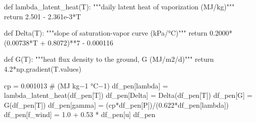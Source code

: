 \documentclass[
  letterpaper,
  DIV=11,
  numbers=noendperiod]{scrreprt}
\newenvironment{Shaded}{\begin{snugshade}}{\end{snugshade}}
\newcommand{\CommentTok}[1]{\textcolor[rgb]{0.37,0.37,0.37}{#1}}
\newcommand{\ControlFlowTok}[1]{\textcolor[rgb]{0.00,0.23,0.31}{#1}}
\newcommand{\DecValTok}[1]{\textcolor[rgb]{0.68,0.00,0.00}{#1}}
\newcommand{\FloatTok}[1]{\textcolor[rgb]{0.68,0.00,0.00}{#1}}
\newcommand{\KeywordTok}[1]{\textcolor[rgb]{0.00,0.23,0.31}{#1}}
\newcommand{\NormalTok}[1]{\textcolor[rgb]{0.00,0.23,0.31}{#1}}
\newcommand{\OperatorTok}[1]{\textcolor[rgb]{0.37,0.37,0.37}{#1}}
\newcommand{\StringTok}[1]{\textcolor[rgb]{0.13,0.47,0.30}{#1}}
\begin{document}
\begin{Shaded}
\begin{Highlighting}[]
\KeywordTok{def}\NormalTok{ lambda\_latent\_heat(T):}
    \CommentTok{"""daily latent heat of vaporization (MJ/kg)"""}
    \ControlFlowTok{return} \FloatTok{2.501} \OperatorTok{{-}} \FloatTok{2.361e{-}3}\OperatorTok{*}\NormalTok{T}

\KeywordTok{def}\NormalTok{ Delta(T):}
    \CommentTok{"""slope of saturation{-}vapor curve (kPa/°C)"""}
    \ControlFlowTok{return} \FloatTok{0.2000}\OperatorTok{*}\NormalTok{(}\FloatTok{0.00738}\OperatorTok{*}\NormalTok{T }\OperatorTok{+} \FloatTok{0.8072}\NormalTok{)}\OperatorTok{**}\DecValTok{7} \OperatorTok{{-}} \FloatTok{0.000116}

\KeywordTok{def}\NormalTok{ G(T):}
    \CommentTok{"""heat flux density to the ground, G (MJ/m2/d)"""}
    \ControlFlowTok{return} \FloatTok{4.2}\OperatorTok{*}\NormalTok{np.gradient(T.values)}

\NormalTok{cp }\OperatorTok{=} \FloatTok{0.001013}  \CommentTok{\# (MJ kg−1 °C−1) }
\NormalTok{df\_pen[}\StringTok{\textquotesingle{}lambda\textquotesingle{}}\NormalTok{] }\OperatorTok{=}\NormalTok{ lambda\_latent\_heat(df\_pen[}\StringTok{\textquotesingle{}T\textquotesingle{}}\NormalTok{])}
\NormalTok{df\_pen[}\StringTok{\textquotesingle{}Delta\textquotesingle{}}\NormalTok{] }\OperatorTok{=}\NormalTok{ Delta(df\_pen[}\StringTok{\textquotesingle{}T\textquotesingle{}}\NormalTok{])}
\NormalTok{df\_pen[}\StringTok{\textquotesingle{}G\textquotesingle{}}\NormalTok{] }\OperatorTok{=}\NormalTok{ G(df\_pen[}\StringTok{\textquotesingle{}T\textquotesingle{}}\NormalTok{])}
\NormalTok{df\_pen[}\StringTok{\textquotesingle{}gamma\textquotesingle{}}\NormalTok{] }\OperatorTok{=}\NormalTok{ (cp}\OperatorTok{*}\NormalTok{df\_pen[}\StringTok{\textquotesingle{}P\textquotesingle{}}\NormalTok{])}\OperatorTok{/}\NormalTok{(}\FloatTok{0.622}\OperatorTok{*}\NormalTok{df\_pen[}\StringTok{\textquotesingle{}lambda\textquotesingle{}}\NormalTok{])}
\NormalTok{df\_pen[}\StringTok{\textquotesingle{}f\_wind\textquotesingle{}}\NormalTok{] }\OperatorTok{=} \FloatTok{1.0} \OperatorTok{+} \FloatTok{0.53} \OperatorTok{*}\NormalTok{ df\_pen[}\StringTok{\textquotesingle{}u\textquotesingle{}}\NormalTok{]}
\NormalTok{df\_pen}
\end{Highlighting}
\end{Shaded}
\end{document}
